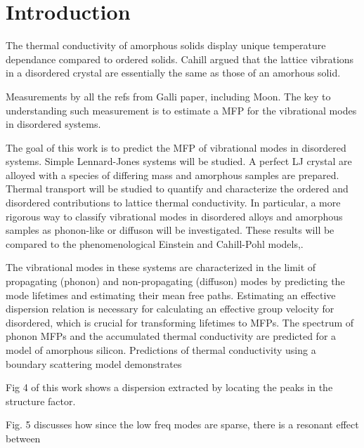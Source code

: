 \documentclass[aps,prb,preprint,superscriptaddress,amsmath,amssymb,floatfix]{revtex4}
\begin{document}
\section{\label{S:Introduction}Introduction}
The thermal conductivity of amorphous solids display 
unique temperature dependance compared to ordered solids.
\cite{freeman_thermal_1986} 
Cahill argued that the lattice vibrations 
in a disordered crystal are essentially the same as those of an amorhous 
solid.
\cite{cahill_lower_1992} 

Measurements by all the refs from Galli paper, including Moon.
\cite{wada_thermal_1996,zink_thermal_2006,yang_anomalously_2010,
cahill_thermal_1994,kuo_thermal_1992,moon_thermal_2002,liu_high_2009}
The key to understanding such measurement is to estimate a MFP for the 
vibrational modes in disordered systems. 

The goal of this work is to predict the MFP of vibrational modes in 
disordered systems. Simple Lennard-Jones systems will be studied.  A 
perfect LJ crystal are alloyed with a species of differing mass and 
amorphous samples are prepared. Thermal transport will be studied to 
quantify and characterize the ordered and 
disordered contributions to lattice thermal conductivity. In particular, a 
more rigorous way to classify vibrational modes in disordered alloys and 
amorphous samples as phonon-like or diffuson will be investigated. These 
results will be compared to the phenomenological Einstein and Cahill-Pohl 
models,\cite{einstein1911,kittel1949,cahill1992}.

The vibrational modes in these systems are
characterized in the limit of propagating (phonon) and 
non-propagating (diffuson) modes by predicting the mode lifetimes and 
estimating their mean free paths. Estimating an effective dispersion
relation is necessary for calculating an effective group velocity for 
disordered, which is crucial for transforming lifetimes to MFPs.
The spectrum of phonon MFPs and the accumulated thermal conductivity 
are predicted for a model of amorphous silicon. Predictions of thermal 
conductivity using a boundary scattering model demonstrates  

Fig 4 of this work shows a dispersion extracted by locating the peaks in 
the structure factor.\cite{vitelli_heat_2010} 

Fig. 5 discusses how since the low freq modes are sparse, there is a 
resonant effect between \cite{feldman_numerical_1999}
\end{document}
